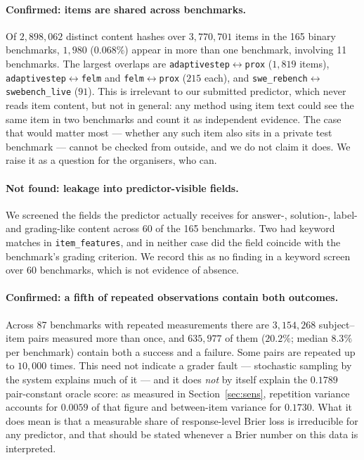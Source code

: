 \documentclass{article}
\begin{document}
\paragraph{Confirmed: items are shared across benchmarks.} Of $2{,}898{,}062$
distinct content hashes over $3{,}770{,}701$ items in the 165 binary benchmarks,
$1{,}980$ ($0.068\%$) appear in more than one benchmark, involving 11 benchmarks.
The largest overlaps are \texttt{adaptivestep}$\leftrightarrow$\texttt{prox}
($1{,}819$ items), \texttt{adaptivestep}$\leftrightarrow$\texttt{felm} and
\texttt{felm}$\leftrightarrow$\texttt{prox} ($215$ each), and
\texttt{swe\_rebench}$\leftrightarrow$\texttt{swebench\_live} ($91$). This is
irrelevant to our submitted predictor, which never reads item content, but not in
general: any method using item text could see the same item in two benchmarks and
count it as independent evidence. The case that would matter most --- whether any
such item also sits in a private test benchmark --- cannot be checked from
outside, and we do not claim it does. We raise it as a question for the
organisers, who can.

\paragraph{Not found: leakage into predictor-visible fields.} We screened the
fields the predictor actually receives for answer-, solution-, label- and
grading-like content across 60 of the 165 benchmarks. Two had keyword matches in
\texttt{item\_features}, and in neither case did the field coincide with the
benchmark's grading criterion. We record this as no finding in a keyword screen
over 60 benchmarks, which is not evidence of absence.

\paragraph{Confirmed: a fifth of repeated observations contain both outcomes.}
Across 87 benchmarks with repeated measurements there are $3{,}154{,}268$
subject--item pairs measured more than once, and $635{,}977$ of them
($20.2\%$; median $8.3\%$ per benchmark) contain both a success and a failure.
Some pairs are repeated up to $10{,}000$ times. This need not indicate a grader
fault --- stochastic sampling by the system explains much of it --- and it does
\emph{not} by itself explain the $0.1789$ pair-constant oracle score: as measured
in Section~\ref{sec:sens}, repetition variance accounts for $0.0059$ of that
figure and between-item variance for $0.1730$. What it does mean is that a
measurable share of response-level Brier loss is irreducible for any predictor,
and that should be stated whenever a Brier number on this data is interpreted.
\end{document}
